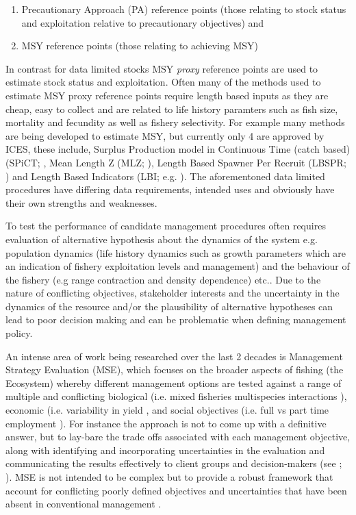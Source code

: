 \documentclass[preprint,review,12pt]{elsarticle}
\begin{document}
\begin{enumerate}
  \item Precautionary Approach (PA) \cite{garcia1995precautionary} reference points (those relating to stock status and exploitation relative to precautionary objectives) and 
  \item MSY reference points (those relating to achieving MSY) 
\end{enumerate}

In contrast for data limited stocks MSY \emph{proxy} reference points are used to estimate stock status and exploitation.  Often many of the methods used to estimate MSY proxy reference points require length based inputs as they are cheap, easy to collect \cite{quinn1999quantitative} and are related to life history paramters such as fish size, mortality and fecundity as well as fishery selectivity. For example many methods are being developed to estimate MSY, but currently only 4 are approved by ICES, these include, Surplus Production model in Continuous Time (catch based) (SPiCT; \cite{pedersen2017stochastic}, Mean Length Z (MLZ; \cite{gedamke2006estimating}), Length Based Spawner Per Recruit (LBSPR; \cite{hordyk2014some}) and Length Based Indicators (LBI; e.g. \cite{probst2013indicator}). The aforementoned data limited procedures have differing data requirements, intended uses and obviously have their own strengths and weaknesses. 

To test the performance of candidate management procedures often requires evaluation of alternative hypothesis about the dynamics of the system e.g. population dynamics (life history dynamics such as growth parameters which are an indication of fishery exploitation levels and management) and the behaviour of the fishery (e.g range contraction and density dependence) etc.. Due to the nature of conflicting objectives, stakeholder interests and the uncertainty in the dynamics of the resource and/or the plausibility of alternative hypotheses can lead to poor decision making and can be problematic when defining management policy.

An intense area of work being researched over the last 2 decades is Management Strategy Evaluation (MSE), which focuses on the broader aspects of fishing (the Ecosystem) whereby different management options are tested against a range of multiple and conflicting biological (i.e. mixed fisheries multispecies interactions \cite{blanchard2014evaluating}), economic (i.e. variability in yield \cite{smith2011impacts}, and social objectives (i.e. full vs part time employment \cite{plaganyi2013integrating}). For instance the approach is not to come up with a definitive answer, but to lay-bare the trade offs associated with each management objective, along with identifying and incorporating uncertainties in the evaluation and communicating the results effectively to client groups and decision-makers (see \cite{kell2007flr}; \cite{punt2015strategic}). MSE is not intended to be complex but to provide a robust framework that account for conflicting poorly defined objectives and uncertainties that have been absent in conventional management \cite{kell2007flr}. 
\end{document}
